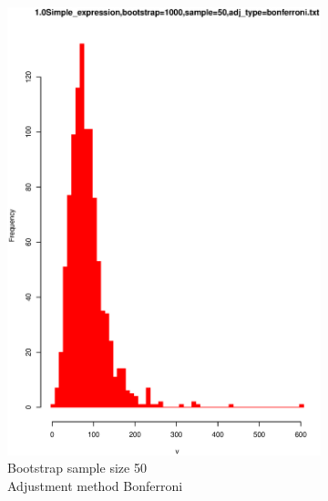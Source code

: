 \documentclass[11pt,a4paper,oneside]{article}
\begin{document}
\begin{figure}
\begin{subfigure}[b]{0.4\textwidth}
\includegraphics[width=\textwidth]{1.0Simple_expression,bootstrap=1000,sample=50,adj_type=bonferroni.txt.eps}
\caption{Bootstrap sample size 50\\Adjustment method Bonferroni}
\label{fig:pm3}
\end{subfigure}
~~~~~~~~~~~~
\begin{subfigure}[b]{0.4\textwidth}

\end{subfigure}
\end{figure}
\end{document}
